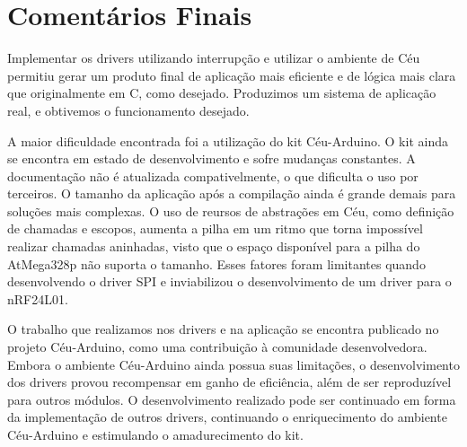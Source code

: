 \documentclass[11pt]{article}
\begin{document}
\section{Comentários Finais}
\tab Implementar os drivers utilizando interrupção e utilizar o ambiente de Céu permitiu gerar um produto final de aplicação mais eficiente e de lógica mais clara que originalmente em C, como desejado. Produzimos um sistema de aplicação real, e obtivemos o funcionamento desejado.
\par A maior dificuldade encontrada foi a utilização do kit Céu-Arduino. O kit ainda se encontra em estado de desenvolvimento e sofre mudanças constantes. A documentação não é atualizada compativelmente, o que dificulta o uso por terceiros. O tamanho da aplicação após a compilação ainda é grande demais para soluções mais complexas. O uso de reursos de abstrações em Céu, como definição de chamadas e escopos, aumenta a pilha em um ritmo que torna impossível realizar chamadas aninhadas, visto que o espaço disponível para a pilha do AtMega328p não suporta o tamanho. Esses fatores foram limitantes quando desenvolvendo o driver SPI e inviabilizou o desenvolvimento de um driver para o nRF24L01.
\par O trabalho que realizamos nos drivers e na aplicação se encontra publicado no projeto Céu-Arduino\cite{githubceuarduino}, como uma contribuição à comunidade desenvolvedora. Embora o ambiente Céu-Arduino ainda possua suas limitações, o desenvolvimento dos drivers provou recompensar em ganho de eficiência, além de ser reproduzível para outros módulos. O desenvolvimento realizado pode ser continuado em forma da implementação de outros drivers, continuando o enriquecimento do ambiente Céu-Arduino e estimulando o amadurecimento do kit.

\newpage

\printbibliography
\end{document}
